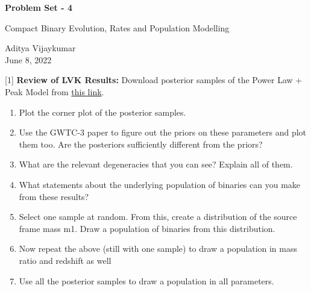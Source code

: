 \documentclass{article} %
\newcommand{\question}[2][]{\begin{flushleft}
        \textbf{Problem #1}: %
\end{flushleft}
}
\newcommand{\maketitletwo}[2][]{\begin{center}
        \Large{\textbf{Problem Set - 4}
            
            Compact Binary Evolution, Rates and Population Modelling} %
        \vspace{10pt}
        
        \normalsize{Aditya Vijaykumar  %
        } \\
        \vspace{5pt}  June 8, 2022     %
        \vspace{15pt}
        
\end{center}}
\begin{document}
    \maketitletwo[5]  %
    
    \question[1]{} \textbf{Review of LVK Results:} 
    Download posterior samples of the Power Law + Peak Model from \href{https://drive.google.com/drive/folders/1lBTo12EoWYjvR0Bf76PSy6tP2ms6nt41?usp=sharing}{this link}.
    \begin{enumerate}
    \item Plot the corner plot of the posterior samples. 
    
    \item Use the GWTC-3 paper to figure out the priors on these parameters and plot them too. Are the posteriors sufficiently different from the priors?
    
    \item What are the relevant degeneracies that you can see? Explain all of them.
    
    
    \item What statements about the underlying population of binaries can you make from these results?
    \item Select one sample at random. From this, create a distribution of the source frame mass m1. Draw a population of binaries from this distribution.
    \item Now repeat the above (still with one sample) to draw a population in mass ratio and redshift as well
    \item Use all the posterior samples to draw a population in all parameters.
\end{enumerate}
\end{document}
